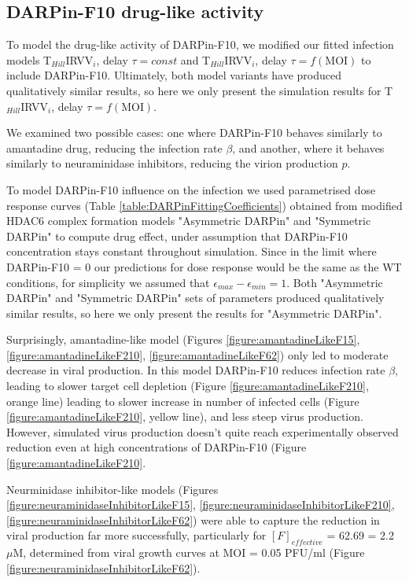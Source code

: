 \subsection{DARPin-F10 drug-like activity}

To model the drug-like activity of DARPin-F10, we modified our fitted infection models T$_{Hill}$IRVV$_i$, delay $\tau = const$ and T$_{Hill}$IRVV$_i$, delay $\tau = f(\text{MOI})$ to include DARPin-F10. Ultimately, both model variants have produced qualitatively similar results, so here we only present the simulation results for T$_{Hill}$IRVV$_i$, delay $\tau = f(\text{MOI})$.

We examined two possible cases: one where DARPin-F10 behaves similarly to amantadine drug, reducing the infection rate $\beta$, and another, where it behaves similarly to neuraminidase inhibitors, reducing the virion production $p$.

To model DARPin-F10 influence on the infection we used parametrised dose response curves (Table \ref{table:DARPinFittingCoefficients}) obtained from modified HDAC6 complex formation models "Asymmetric DARPin" and "Symmetric DARPin" to compute drug effect, under assumption that DARPin-F10 concentration stays constant throughout simulation. Since in the limit where DARPin-F10 = 0 our predictions for dose response would be the same as the WT conditions, for simplicity we assumed that $\epsilon_{max} - \epsilon_{min} = 1$. Both "Asymmetric DARPin" and "Symmetric DARPin"  sets of parameters produced qualitatively similar results, so here we only present the results for "Asymmetric DARPin".

Surprisingly, amantadine-like model (Figures \ref{figure:amantadineLikeF15}, \ref{figure:amantadineLikeF210}, \ref{figure:amantadineLikeF62}) only led to moderate decrease in viral production. In this model DARPin-F10 reduces infection rate $\beta$, leading to slower target cell depletion (Figure \ref{figure:amantadineLikeF210}, orange line) leading to slower increase in number of infected cells (Figure \ref{figure:amantadineLikeF210}, yellow line), and less steep virus production. However, simulated virus production doesn't quite reach experimentally observed reduction even at high concentrations of DARPin-F10 (Figure \ref{figure:amantadineLikeF210}.

Neurminidase inhibitor-like models (Figures \ref{figure:neuraminidaseInhibitorLikeF15}, \ref{figure:neuraminidaseInhibitorLikeF210}, \ref{figure:neuraminidaseInhibitorLikeF62}) were able to capture the reduction in viral production far more successfully, particularly for $[F]_{effective}$ = 62.69 = 2.2 $\mu$M, determined from viral growth curves at MOI = 0.05 PFU/ml (Figure \ref{figure:neuraminidaseInhibitorLikeF62}).

